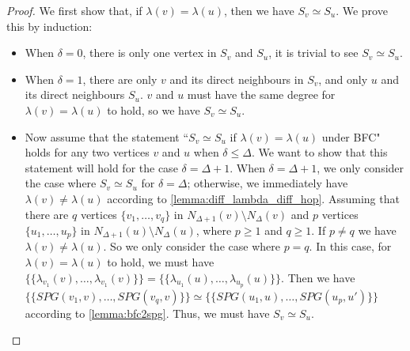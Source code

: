 \begin{proof}
We first show that, if $\lambda(v)=\lambda(u)$, then we have $S_v\simeq S_u$.
We prove this by induction:
\begin{itemize}
    \item When $\delta=0$, there is only one vertex in $S_v$ and $S_u$, it is trivial to see $S_v\simeq S_u$.
    \item When $\delta=1$, there are only $v$ and its direct neighbours in $S_v$, and only $u$ and its direct neighbours $S_u$. $v$ and $u$ must have the same degree for $\lambda(v)=\lambda(u)$ to hold, so we have $S_v\simeq S_u$.
    \item Now assume that the statement ``$S_v\simeq S_u$ if $\lambda(v)= \lambda(u)$ under BFC" holds for any two vertices $v$ and $u$ when $\delta\leq \Delta$. We want to show that this statement will hold for the case $\delta= \Delta+1$.     When $\delta=\Delta+1$, we only consider the case where $S_v\simeq S_u$ for $\delta=\Delta$; otherwise, we immediately have $\lambda(v) \neq \lambda(u)$ according to \cref{lemma:diff_lambda_diff_hop}. Assuming that there are $q$ vertices $\{v_1, \dots, v_q\}$ in $N_{\Delta+1}(v)\setminus N_{\Delta}(v)$ and $p$ vertices $\{u_1, \dots, u_p\}$ in $N_{\Delta+1}(u)\setminus N_{\Delta}(u)$, where $p\geq 1$ and $q\geq 1$. If $p \neq q$ we have $\lambda(v) \neq \lambda(u)$. So we only consider the case where $p=q$.
    In this case, for $\lambda(v)= \lambda(u)$ to hold, we must have $\{\!\!\{\lambda_{v_1}(v),\dots,\lambda_{v_1}(v)\}\!\!\} = \{\!\!\{\lambda_{u_1}(u),\dots, \lambda_{u_p}(u)\}\!\!\}$. Then we have $\{\!\!\{SPG(v_1,v),\dots, SPG(v_q,v)\}\!\!\} \simeq \{\!\!\{SPG(u_1,u),\dots, SPG(u_p,u')\}\!\!\}$ according to \cref{lemma:bfc2spg}. Thus, we must have $S_v\simeq S_u$.

\end{itemize}


\end{proof}
